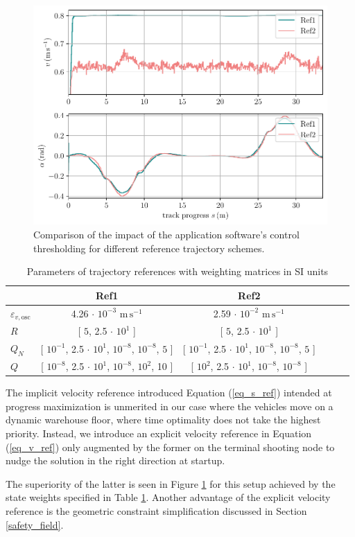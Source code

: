 \begin{figure}[h!tbp]
\includegraphics[width=1\textwidth]{figures/experiments/ucomp_ref}
\caption{Comparison of the impact of the application software's control thresholding for different reference trajectory schemes.} \label{fig_ucomp_ref}
\end{figure}
\begin{table}[h!tbp]
    \small
	\begin{center}
        \begin{tabular}{lccccl}\toprule
		    & \textbf{Ref1} & \textbf{Ref2}\\
            \midrule
            $\varepsilon_{v, \mathrm{osc}} $ & 4.26 $\cdot$ $10^{-3}$ $\mathrm{m\,s^{-1}}$& 2.59 $\cdot$ $10^{-2}$ $\mathrm{m\,s^{-1}}$\\
            $R$ & [ $5$, 2.5 $\cdot$ $10^{1}$ ] & [ $5$, 2.5 $\cdot$ $10^{1}$ ]\\
            $Q_{N}$ & [ $10^{-1}$, 2.5 $\cdot$ $10^{1}$, $10^{-8}$, $10^{-8}$, $5$ ] & [ $10^{-1}$, 2.5 $\cdot$ $10^{1}$, $10^{-8}$, $10^{-8}$, $5$ ]\\
            $Q$ & [ $10^{-8}$, 2.5 $\cdot$ $10^1$, $10^{-8}$, $10^{2}$, 10 ] & [ $10^{2}$, 2.5 $\cdot$ $10^1$, $10^{-8}$, $10^{-8}$ ] \\
		    \bottomrule
		\end{tabular}
	\end{center}
    \caption{Parameters of trajectory references with weighting matrices in SI units}
    \label{weight_ref}
\end{table}
The implicit velocity reference introduced Equation (\ref{eq_s_ref}) intended at progress maximization is unmerited in our case where the vehicles move on a dynamic warehouse floor, where time optimality does not take the highest priority. Instead, we introduce an explicit velocity reference in Equation (\ref{eq_v_ref}) only augmented by the former on the terminal shooting node to nudge the solution in the right direction at startup.
\par The superiority of the latter is seen in Figure \ref{fig_ucomp_ref} for this setup achieved by the state weights specified in Table \ref{weight_ref}. Another advantage of the explicit velocity reference is the geometric constraint simplification discussed in Section \ref{safety_field}.
